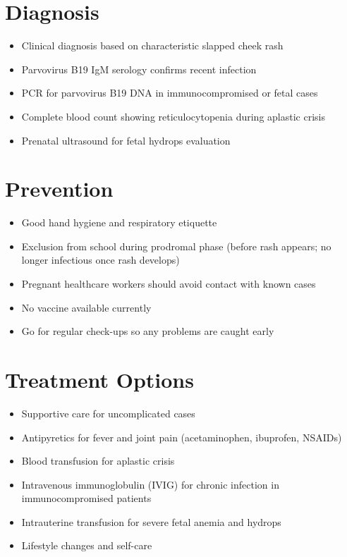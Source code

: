 \section{Diagnosis}

\begin{itemize}[noitemsep]
  \item Clinical diagnosis based on characteristic slapped cheek rash
  \item Parvovirus B19 IgM serology confirms recent infection
  \item PCR for parvovirus B19 DNA in immunocompromised or fetal cases
  \item Complete blood count showing reticulocytopenia during aplastic crisis
  \item Prenatal ultrasound for fetal hydrops evaluation
\end{itemize}

\section{Prevention}

\begin{itemize}[noitemsep]
  \item Good hand hygiene and respiratory etiquette
  \item Exclusion from school during prodromal phase (before rash appears; no longer infectious once rash develops)
  \item Pregnant healthcare workers should avoid contact with known cases
  \item No vaccine available currently
  \item Go for regular check-ups so any problems are caught early
\end{itemize}

\section{Treatment Options}

\begin{itemize}[noitemsep]
  \item Supportive care for uncomplicated cases
  \item Antipyretics for fever and joint pain (acetaminophen, ibuprofen, NSAIDs)
  \item Blood transfusion for aplastic crisis
  \item Intravenous immunoglobulin (IVIG) for chronic infection in immunocompromised patients
  \item Intrauterine transfusion for severe fetal anemia and hydrops
  \item Lifestyle changes and self-care
\end{itemize}

